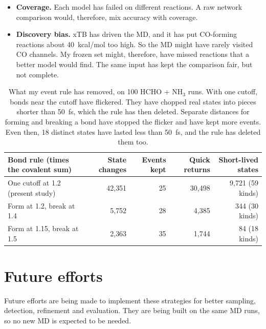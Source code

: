\documentclass[11pt]{article}
\newcommand{\kcal}{kcal/mol}
\begin{document}
\begin{itemize}
for decarboxylation). Bringing in the water has cost entropy. The reported
lowering of up to 16~\kcal{} \cite{wolf2020} has referred to electronic
energies. So I have not been able to compare them yet.
\item \textbf{Coverage.} Each model has failed on different reactions. A
raw network comparison would, therefore, mix accuracy with coverage.
\item \textbf{Discovery bias.} xTB has driven the MD, and it has put
CO-forming reactions about 40~\kcal{} too high. So the MD might have rarely
visited CO channels. My frozen set might, therefore, have missed reactions
that a better model would find. The same input has kept the comparison
fair, but not complete.
\end{itemize}

\begin{table}[htbp]
\centering
\caption{What my event rule has removed, on 100 HCHO + NH$_3$ runs. With
one cutoff, bonds near the cutoff have flickered. They have chopped real
states into pieces shorter than 50~fs, which the rule has then deleted.
Separate distances for forming and breaking a bond have stopped the
flicker and have kept more events. Even then, 18 distinct states have
lasted less than 50~fs, and the rule has deleted them too.}
\label{tab:census}
\small
\begin{tabular}{@{}lrrrr@{}}
\toprule
Bond rule (times the covalent sum) & State changes & Events kept &
Quick returns & Short-lived states \\
\midrule
One cutoff at 1.2 (present study) & 42{,}351 & 25 & 30{,}498 & 9{,}721
(59 kinds) \\
Form at 1.2, break at 1.4 & 5{,}752 & 28 & 4{,}385 & 344 (30 kinds) \\
Form at 1.15, break at 1.5 & 2{,}363 & 35 & 1{,}744 & 84 (18 kinds) \\
\bottomrule
\end{tabular}
\end{table}

\section{Future efforts}

Future efforts are being made to implement these strategies for better
sampling, detection, refinement and evaluation. They are being built on the
same MD runs, so no new MD is expected to be needed.
\end{document}
